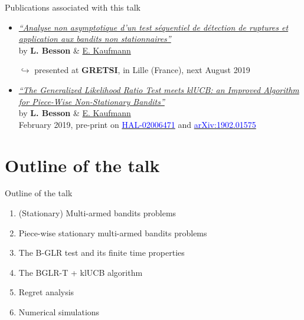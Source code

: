 \documentclass[11pt,english,ignorenonframetext,]{beamer}
\begin{document}
\begin{frame}{Publications associated with this talk}

  \begin{itemize}
    \item
      \href{https://hal.inria.fr/hal-02006471/document}{\emph{``Analyse non asymptotique d'un test séquentiel de détection de ruptures et application aux bandits non stationnaires''}}\\
      by \textbf{L. Besson} \&
      \href{http://chercheurs.lille.inria.fr/ekaufman/research.html}{E.
      Kaufmann}

      $\hookrightarrow$ presented at
      \textbf{GRETSI}, in Lille (France), next August 2019

    \vspace*{30pt}

    \item
      \href{https://hal.inria.fr/hal-02006471/document}{\emph{``The Generalized Likelihood Ratio Test meets klUCB: an Improved Algorithm for Piece-Wise Non-Stationary Bandits''}}\\
      by \textbf{L. Besson} \&
      \href{http://chercheurs.lille.inria.fr/ekaufman/research.html}{E.
      Kaufmann}\\
      February 2019,
      pre-print on
      \href{https://hal.inria.fr/hal-02006471}{\textcolor{blue}{HAL-02006471}}
      and
      \href{https://arxiv.org/abs/1902.01575}{\textcolor{blue}{arXiv:1902.01575}}

  \end{itemize}

\end{frame}


\section{\hfill{}Outline of the talk\hfill{}}

\begin{frame}{Outline of the talk}

  \begin{enumerate}
    \item
      (Stationary) Multi-armed bandits problems
    \vspace*{15pt}

    \item
      Piece-wise stationary multi-armed bandits problems
    \vspace*{15pt}

    \item
      The B-GLR test and its finite time properties
    \vspace*{15pt}

    \item
      The BGLR-T + klUCB algorithm
    \vspace*{15pt}

    \item
      Regret analysis
    \vspace*{15pt}

    \item
      Numerical simulations
  \end{enumerate}

\end{frame}
\end{document}

